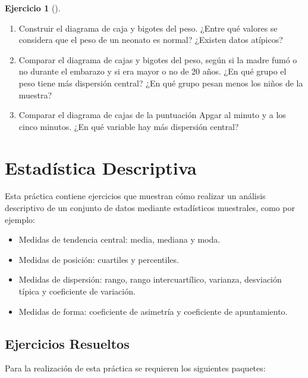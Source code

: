 \documentclass[
  a4paper,
]{scrreport}
\providecommand{\tightlist}{%
  \setlength{\itemsep}{0pt}\setlength{\parskip}{0pt}}\usepackage{longtable,booktabs,array}
\theoremstyle{definition}
\newtheorem{exercise}{Ejercicio}[chapter]
\theoremstyle{remark}
\begin{document}
\begin{exercise}[]
\begin{enumerate}
  Comparar la distribución de frecuencias relativas del peso de los
  neonatos según si la madre fumaba o no antes del embarazo. ¿Qué se
  puede concluir?
\item
  Construir el diagrama de caja y bigotes del peso. ¿Entre qué valores
  se considera que el peso de un neonato es normal? ¿Existen datos
  atípicos?
\item
  Comparar el diagrama de cajas y bigotes del peso, según si la madre
  fumó o no durante el embarazo y si era mayor o no de 20 años. ¿En qué
  grupo el peso tiene más dispersión central? ¿En qué grupo pesan menos
  los niños de la muestra?
\item
  Comparar el diagrama de cajas de la puntuación Apgar al minuto y a los
  cinco minutos. ¿En qué variable hay más dispersión central?
\end{enumerate}

\end{exercise}


\chapter{Estadística Descriptiva}\label{estaduxedstica-descriptiva}

Esta práctica contiene ejercicios que muestran cómo realizar un análisis
descriptivo de un conjunto de datos mediante estadísticos muestrales,
como por ejemplo:

\begin{itemize}
\tightlist
\item
  Medidas de tendencia central: media, mediana y moda.
\item
  Medidas de posición: cuartiles y percentiles.
\item
  Medidas de dispersión: rango, rango intercuartílico, varianza,
  desviación típica y coeficiente de variación.
\item
  Medidas de forma: coeficiente de asimetría y coeficiente de
  apuntamiento.
\end{itemize}

\section{Ejercicios Resueltos}\label{ejercicios-resueltos-3}

Para la realización de esta práctica se requieren los siguientes
paquetes:
\end{document}
